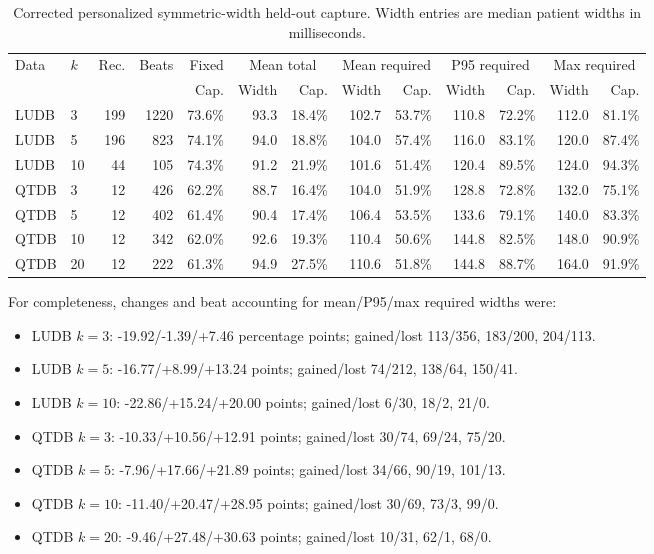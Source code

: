 \documentclass[11pt,a4paper]{article}
\begin{document}
\begin{landscape}
\begin{table}[H]
\centering
\small
\caption{Corrected personalized symmetric-width held-out capture. Width entries are median patient widths in milliseconds.}
\begin{tabular}{llrrrrrrrrrrr}
\toprule
Data & $k$ & Rec. & Beats & Fixed & \multicolumn{2}{c}{Mean total} & \multicolumn{2}{c}{Mean required} & \multicolumn{2}{c}{P95 required} & \multicolumn{2}{c}{Max required} \\
\cmidrule(lr){6-7}\cmidrule(lr){8-9}\cmidrule(lr){10-11}\cmidrule(lr){12-13}
&&&& Cap. & Width & Cap. & Width & Cap. & Width & Cap. & Width & Cap. \\
\midrule
LUDB & 3 & 199 & 1220 & 73.6\% & 93.3 & 18.4\% & 102.7 & 53.7\% & 110.8 & 72.2\% & 112.0 & 81.1\% \\
LUDB & 5 & 196 & 823 & 74.1\% & 94.0 & 18.8\% & 104.0 & 57.4\% & 116.0 & 83.1\% & 120.0 & 87.4\% \\
LUDB & 10 & 44 & 105 & 74.3\% & 91.2 & 21.9\% & 101.6 & 51.4\% & 120.4 & 89.5\% & 124.0 & 94.3\% \\
QTDB & 3 & 12 & 426 & 62.2\% & 88.7 & 16.4\% & 104.0 & 51.9\% & 128.8 & 72.8\% & 132.0 & 75.1\% \\
QTDB & 5 & 12 & 402 & 61.4\% & 90.4 & 17.4\% & 106.4 & 53.5\% & 133.6 & 79.1\% & 140.0 & 83.3\% \\
QTDB & 10 & 12 & 342 & 62.0\% & 92.6 & 19.3\% & 110.4 & 50.6\% & 144.8 & 82.5\% & 148.0 & 90.9\% \\
QTDB & 20 & 12 & 222 & 61.3\% & 94.9 & 27.5\% & 110.6 & 51.8\% & 144.8 & 88.7\% & 164.0 & 91.9\% \\
\bottomrule
\end{tabular}
\end{table}
\end{landscape}

For completeness, changes and beat accounting for mean/P95/max required widths were:

\begin{itemize}
  \item LUDB $k=3$: -19.92/-1.39/+7.46 percentage points; gained/lost 113/356, 183/200, 204/113.
  \item LUDB $k=5$: -16.77/+8.99/+13.24 points; gained/lost 74/212, 138/64, 150/41.
  \item LUDB $k=10$: -22.86/+15.24/+20.00 points; gained/lost 6/30, 18/2, 21/0.
  \item QTDB $k=3$: -10.33/+10.56/+12.91 points; gained/lost 30/74, 69/24, 75/20.
  \item QTDB $k=5$: -7.96/+17.66/+21.89 points; gained/lost 34/66, 90/19, 101/13.
  \item QTDB $k=10$: -11.40/+20.47/+28.95 points; gained/lost 30/69, 73/3, 99/0.
  \item QTDB $k=20$: -9.46/+27.48/+30.63 points; gained/lost 10/31, 62/1, 68/0.
\end{itemize}
\end{document}
